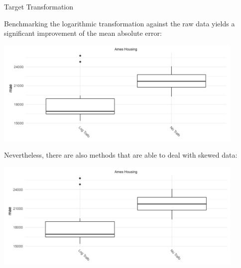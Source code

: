 \begin{vbframe}{Target Transformation}
  \framebreak
  
  Benchmarking the logarithmic transformation against the raw data yields a significant improvement of the mean absolute error:
  
  \begin{center}
    \includegraphics[width=0.9\textwidth]{figure_man/target03.png}
  \end{center}
  
  \framebreak
  
  Nevertheless, there are also methods that are able to deal with skewed data:
  
  
  \begin{center}
    \includegraphics[width=0.9\textwidth]{figure_man/target04.png}
  \end{center}
  
\end{vbframe}

